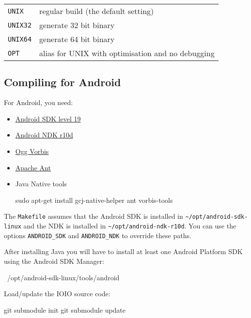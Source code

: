 \begin{tabular}{lp{8cm}}

\texttt{UNIX} & regular build (the default setting) \\

\texttt{UNIX32} & generate 32 bit binary \\

\texttt{UNIX64} & generate 64 bit binary \\

\texttt{OPT} & alias for UNIX with optimisation and no debugging \\

\end{tabular}

\subsection{Compiling for Android}

For Android, you need:

\begin{itemize}
\item \href{http://developer.android.com/sdk/}{Android SDK level 19}
\item \href{http://developer.android.com/sdk/ndk/}{Android NDK r10d}
\item \href{http://www.vorbis.com/}{Ogg Vorbis}
\item \href{http://ant.apache.org/}{Apache Ant}
\item {Java Native tools 
\begin{verbatim*}
sudo apt-get install gcj-native-helper ant vorbis-tools
\end{verbatim*}}
\end{itemize}

The \texttt{Makefile} assumes that the Android SDK is installed in
\verb|~/opt/android-sdk-linux| and the NDK is installed in
\verb|~/opt/android-ndk-r10d|.  You can use the options
\verb|ANDROID_SDK| and \verb|ANDROID_NDK| to override these paths.

After installing Java you will have to install at least one Android Platform SDK using the Android SDK Manager:

\begin{verbatim*}
~/opt/android-sdk-linux/tools/android
\end{verbatim*}

Load/update the IOIO source code:

\begin{verbatim*}
git submodule init
git submodule update
\end{verbatim*}

